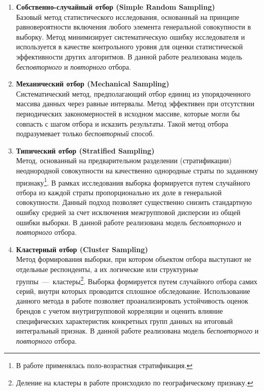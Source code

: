 \begin{enumerate}
    \item \textbf{Собственно-случайный отбор (Simple Random Sampling)}\\
    Базовый метод статистического исследования, основанный на принципе равновероятности включения любого элемента генеральной совокупности в выборку. Метод минимизирует систематическую ошибку исследователя и используется в качестве контрольного уровня для оценки статистической эффективности других алгоритмов. В данной работе реализована модель \textit{бесповторного} и \textit{повторного} отбора.

    \item \textbf{Механический отбор (Mechanical Sampling)} \\
    Систематический метод, предполагающий отбор единиц из упорядоченного массива данных через равные интервалы. Метод эффективен при отсутствии периодических закономерностей в исходном массиве, которые могли бы совпасть с шагом отбора и исказить результаты. Такой метод отбора подразумевает только \textit{бесповторный} способ.
    
    \item \textbf{Типический отбор (Stratified Sampling)} \\
    Метод, основанный на предварительном разделении (стратификации) неоднородной совокупности на качественно однородные страты по заданному признаку\footnote{В работе применялась поло-возрастная стратификация.}. В рамках исследования выборка формируется путем случайного отбора из каждой страты пропорционально их доле в генеральной совокупности. Данный подход позволяет существенно снизить стандартную ошибку средней за счет исключения межгрупповой дисперсии из общей ошибки выборки. В данной работе реализована модель \textit{бесповторного} и \textit{повторного} отбора.
    
    \item \textbf{Кластерный отбор (Cluster Sampling)} \\
    Метод формирования выборки, при котором объектом отбора выступают не отдельные респонденты, а их логические или структурные группы~---~кластеры\footnote{Деление на кластеры в работе происходило по географическому признаку.}. Выборка формируется путем случайного отбора самих серий, внутри которых проводится сплошное обследование. Использование данного метода в работе позволяет проанализировать устойчивость оценок брендов с учетом внутригрупповой корреляции и оценить влияние специфических характеристик конкретных групп данных на итоговый интегральный признак. В данной работе реализована модель \textit{бесповторного} и \textit{повторного} отбора.
\end{enumerate}


